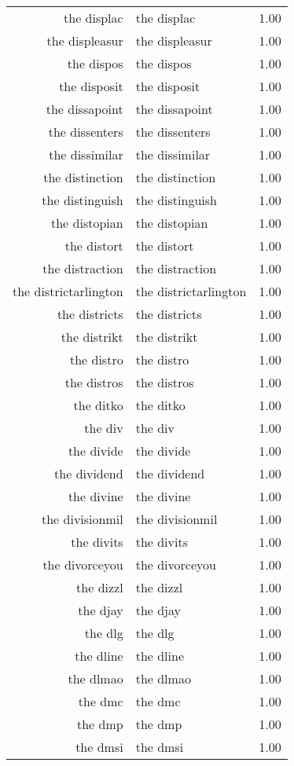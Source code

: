 \begin{table}[ht]
\begin{tabular}{rlr}
  the displac & the displac & 1.00 \\ 
  the displeasur & the displeasur & 1.00 \\ 
  the dispos & the dispos & 1.00 \\ 
  the disposit & the disposit & 1.00 \\ 
  the dissapoint & the dissapoint & 1.00 \\ 
  the dissenters & the dissenters & 1.00 \\ 
  the dissimilar & the dissimilar & 1.00 \\ 
  the distinction & the distinction & 1.00 \\ 
  the distinguish & the distinguish & 1.00 \\ 
  the distopian & the distopian & 1.00 \\ 
  the distort & the distort & 1.00 \\ 
  the distraction & the distraction & 1.00 \\ 
  the districtarlington & the districtarlington & 1.00 \\ 
  the districts & the districts & 1.00 \\ 
  the distrikt & the distrikt & 1.00 \\ 
  the distro & the distro & 1.00 \\ 
  the distros & the distros & 1.00 \\ 
  the ditko & the ditko & 1.00 \\ 
  the div & the div & 1.00 \\ 
  the divide & the divide & 1.00 \\ 
  the dividend & the dividend & 1.00 \\ 
  the divine & the divine & 1.00 \\ 
  the divisionmil & the divisionmil & 1.00 \\ 
  the divits & the divits & 1.00 \\ 
  the divorceyou & the divorceyou & 1.00 \\ 
  the dizzl & the dizzl & 1.00 \\ 
  the djay & the djay & 1.00 \\ 
  the dlg & the dlg & 1.00 \\ 
  the dline & the dline & 1.00 \\ 
  the dlmao & the dlmao & 1.00 \\ 
  the dmc & the dmc & 1.00 \\ 
  the dmp & the dmp & 1.00 \\ 
  the dmsi & the dmsi & 1.00 \\ 

\end{tabular}
\end{table}
